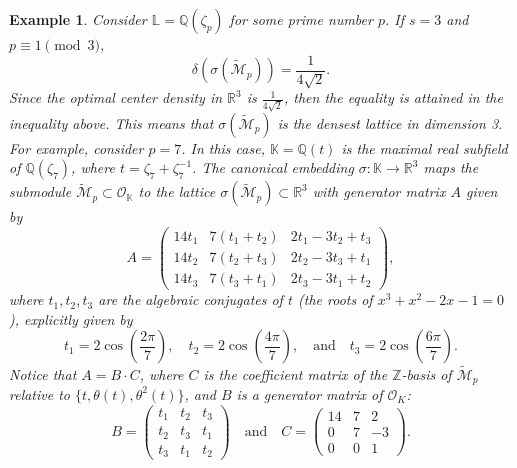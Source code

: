 \documentclass{amsart}
\newtheorem{example}[theorem]{Example}
\begin{document}
\begin{example} Consider $\mathbb{L}=\mathbb{Q}(\zeta_p)$ for some prime number $p$. If $s=3$ and $p \equiv 1 \pmod 3$,  \[ \delta(\sigma(\tilde{\mathcal{M}}_p)) = \frac{1}{4\sqrt{2}}. \]
Since the optimal center density in $\mathbb{R}^3$ is $\frac{1}{4\sqrt{2}}$, then the equality is attained in the inequality above. This means that $\sigma(\tilde{\mathcal{M}}_p)$ is the densest lattice in dimension 3. 
For example, consider $p=7$. In this case, $\mathbb{K} = \mathbb{Q}(t)$ is the maximal real subfield of $\mathbb{Q}(\zeta_7)$, where $t = \zeta_7 + \zeta_7^{-1}$. The canonical embedding $\sigma: \mathbb{K} \to \mathbb{R}^3$ maps the submodule $\tilde{\mathcal{M}}_p \subset \mathcal{O}_\mathbb{K}$ to the lattice $\sigma(\tilde{\mathcal{M}}_p) \subset \mathbb{R}^3$ with generator matrix $A$ given by
\[
A = \begin{pmatrix}
14 t_1 & 7(t_1 + t_2) & 2t_1 - 3t_2 + t_3 \\
14 t_2 & 7(t_2 + t_3) & 2t_2 - 3t_3 + t_1 \\
14 t_3 & 7(t_3 + t_1) & 2t_3 - 3t_1 + t_2
\end{pmatrix},
\]
where $t_1, t_2, t_3$ are the algebraic conjugates of $t$ (the roots of $x^3 + x^2 - 2x - 1 = 0$), explicitly given by
\[
t_1 = 2\cos\left(\frac{2\pi}{7}\right), \quad t_2 = 2\cos\left(\frac{4\pi}{7}\right), \quad \text{and} \quad t_3 = 2\cos\left(\frac{6\pi}{7}\right).
\]
Notice that $A = B \cdot C$, where $C$ is the coefficient matrix of the $\mathbb{Z}$-basis of $\tilde{\mathcal{M}}_p$ relative to $\{t, \theta(t), \theta^2(t)\}$, and $B$ is a generator matrix of $\mathcal{O}_K$:
\[
B = \begin{pmatrix}
t_1 & t_2 & t_3 \\
t_2 & t_3 & t_1 \\
t_3 & t_1 & t_2
\end{pmatrix}
\quad \text{and} \quad
C = \begin{pmatrix}
14 & 7 & 2 \\
0 & 7 & -3 \\
0 & 0 & 1
\end{pmatrix}.
\]
\end{example} 
\end{document}

